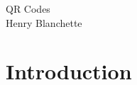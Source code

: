 \documentclass{article}
\renewcommand{\=}{\equiv}
\begin{document}
\begin{center}
  {\huge\sc QR Codes}
  \\[2em]
  {\large Henry Blanchette}
\end{center}

\vspace{4em}

\section{Introduction}
\end{document}
